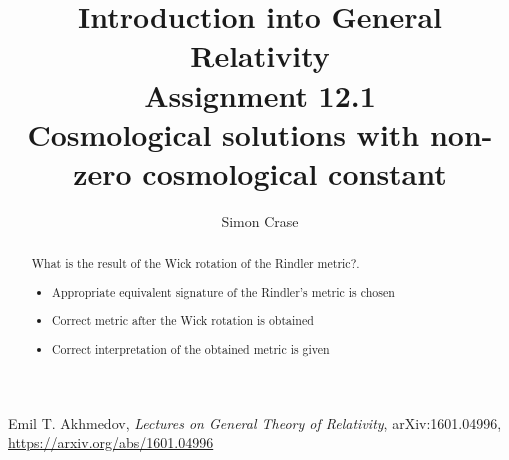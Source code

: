 \documentclass[]{article}
\title{Introduction into General Relativity\\Assignment 12.1\\Cosmological solutions with non-zero cosmological constant}
\author{Simon Crase}
\begin{document}
\maketitle

\begin{abstract}
What is the result of the Wick rotation of the Rindler metric?.
\begin{itemize}
	\item     Appropriate equivalent signature of the Rindler's metric is chosen
	\item  Correct metric after the Wick rotation is obtained
	\item  Correct interpretation of the obtained metric is given
\end{itemize}
\end{abstract}

\section{}

\begin{thebibliography}{9}\label{section:biblio}
	\raggedright
	Emil T. Akhmedov,
	\emph{Lectures on General Theory of Relativity},
	arXiv:1601.04996,
	\url{https://arxiv.org/abs/1601.04996}
\end{thebibliography}
\end{document}
